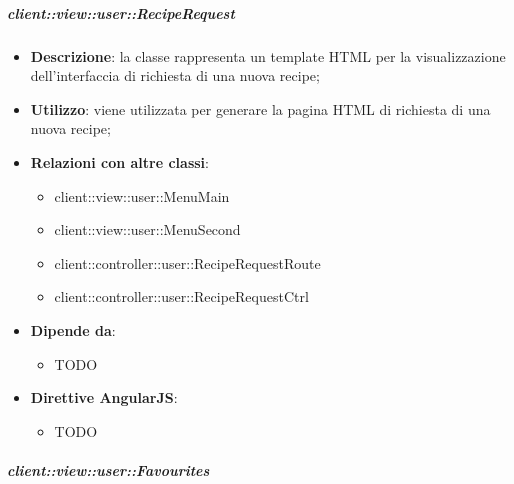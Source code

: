 		\subparagraph{client::view::user::RecipeRequest} %
		\label{subp:bdsm_app_client_view_user_reciperequest}
			\begin{itemize}
				\item \textbf{Descrizione}: la classe rappresenta un template HTML per la visualizzazione dell'interfaccia di richiesta di una nuova recipe;
				\item \textbf{Utilizzo}: viene utilizzata per generare la pagina HTML di richiesta di una nuova recipe;
				\item \textbf{Relazioni con altre classi}:
					\begin{itemize}
						\item client::view::user::MenuMain
						\item client::view::user::MenuSecond
						\item client::controller::user::RecipeRequestRoute
						\item client::controller::user::RecipeRequestCtrl
					\end{itemize}
				\item \textbf{Dipende da}:
					\begin{itemize}
						\item TODO
					\end{itemize}
				\item \textbf{Direttive AngularJS}:
					\begin{itemize}
						\item TODO
					\end{itemize}
			\end{itemize}

		\subparagraph{client::view::user::Favourites} %
		\label{subp:bdsm_app_client_view_user_favourites}

